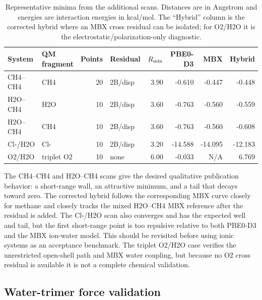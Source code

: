 \documentclass[11pt]{article}
\begin{document}
\begin{table}[htbp]
  \centering
  \small
  \begin{tabular}{llrlrrrr}
    \toprule
    System & QM fragment & Points & Residual & $R_{\rm min}$ &
    PBE0-D3 & MBX & Hybrid \\
    \midrule
    CH4--CH4 & CH4 & 20 & 2B/disp & 3.90 & -0.610 & -0.447 & -0.448 \\
    H2O--CH4 & H2O & 10 & 2B/disp & 3.60 & -0.763 & -0.560 & -0.559 \\
    H2O--CH4 & CH4 & 10 & 2B/disp & 3.60 & -0.763 & -0.560 & -0.608 \\
    Cl-/H2O & Cl- & 10 & 2B/disp & 3.20 & -14.588 & -14.095 & -12.183 \\
    O2/H2O & triplet O2 & 10 & none & 6.00 & -0.033 & N/A & 6.769 \\
    \bottomrule
  \end{tabular}
  \caption{Representative minima from the additional scans. Distances are
  in Angstrom and energies are interaction energies in kcal/mol. The
  ``Hybrid'' column is the corrected hybrid where an MBX cross residual can
  be isolated; for O2/H2O it is the electrostatic/polarization-only
  diagnostic.}
  \label{tab:small_pair_scan_summary}
\end{table}

The CH4--CH4 and H2O--CH4 scans give the desired qualitative publication
behavior: a short-range wall, an attractive minimum, and a tail that
decays toward zero. The corrected hybrid follows the corresponding MBX
curve closely for methane and closely tracks the mixed H2O--CH4 MBX
reference after the residual is added. The Cl-/H2O scan also converges and
has the expected well and tail, but the first short-range point is too
repulsive relative to both PBE0-D3 and the MBX ion-water model. This should
be revisited before using ionic systems as an acceptance benchmark. The
triplet O2/H2O case verifies the unrestricted open-shell path and MBX water
coupling, but because no O2 cross residual is available it is not a
complete chemical validation.

\subsection{Water-trimer force validation}
\end{document}

